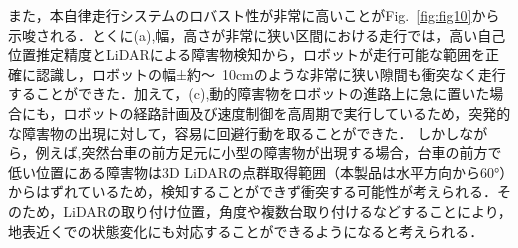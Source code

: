 また，本自律走行システムのロバスト性が非常に高いことがFig.~\ref{fig:fig10}から示唆される．とくに(a),幅，高さが非常に狭い区間における走行では，高い自己位置推定精度とLiDARによる障害物検知から，ロボットが走行可能な範囲を正確に認識し，ロボットの幅±約〜~10cmのような非常に狭い隙間も衝突なく走行することができた．加えて，(c),動的障害物をロボットの進路上に急に置いた場合にも，ロボットの経路計画及び速度制御を高周期で実行しているため，突発的な障害物の出現に対して，容易に回避行動を取ることができた．
しかしながら，例えば,突然台車の前方足元に小型の障害物が出現する場合，台車の前方で低い位置にある障害物は3D LiDARの点群取得範囲（本製品は水平方向から60°）からはずれているため，検知することができず衝突する可能性が考えられる．そのため，LiDARの取り付け位置，角度や複数台取り付けるなどすることにより，地表近くでの状態変化にも対応することができるようになると考えられる．
